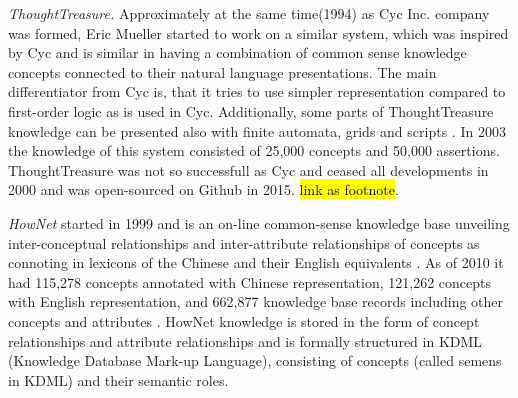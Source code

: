 \emph{ThoughtTreasure.} Approximately at the same time(1994) as Cyc Inc. company was formed, Eric Mueller started to work on a similar system, which was inspired by Cyc and is similar in having a combination of common sense knowledge concepts connected to their natural language presentations. The main differentiator from Cyc is, that it tries to use simpler representation compared to first-order logic as is used in Cyc. Additionally, some parts of ThoughtTreasure knowledge can be presented also with finite automata, grids and scripts \parencite{Mueller1999,Mueller2003}. In 2003 the knowledge of this system consisted of 25,000 concepts and 50,000 assertions. ThoughtTreasure was not so successfull as Cyc and ceased all developments in 2000 and was open-sourced on Github in 2015. \hl{link as footnote}.

\emph{HowNet} started in 1999 and is an on-line common-sense knowledge base unveiling inter-conceptual relationships and inter-attribute relationships of concepts as connoting in lexicons of the Chinese and their English equivalents . As of 2010 it had 115,278 concepts annotated with Chinese representation, 121,262 concepts with English representation, and 662,877 knowledge base records including other concepts and attributes \parencite{Dong2010}. HowNet knowledge is stored in the form of concept relationships and attribute relationships and is formally structured in KDML (Knowledge Database Mark-up Language), consisting of concepts (called semens in KDML) and their semantic roles.
 
